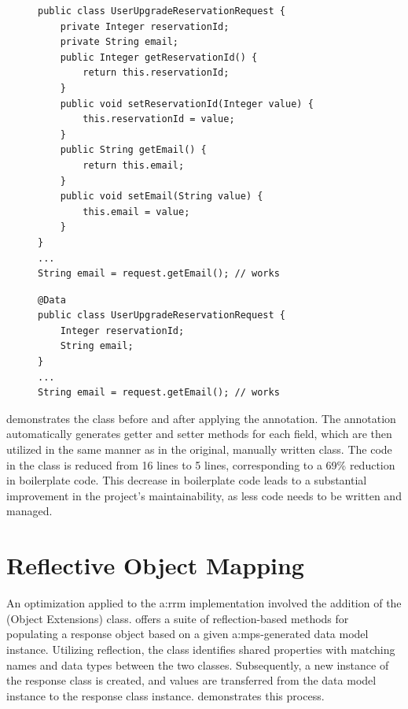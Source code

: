\begin{figure}[H]
\begin{minipage}[t]{0.5\textwidth}
\begin{verbatim}
public class UserUpgradeReservationRequest {
    private Integer reservationId;
    private String email;
    public Integer getReservationId() {
        return this.reservationId;
    }
    public void setReservationId(Integer value) {
        this.reservationId = value;
    }
    public String getEmail() {
        return this.email;
    }
    public void setEmail(String value) {
        this.email = value;
    }
}
...
String email = request.getEmail(); // works
\end{verbatim}
\end{minipage}
\hfill
\begin{minipage}[t]{0.5\textwidth}
\begin{verbatim}
@Data
public class UserUpgradeReservationRequest {
    Integer reservationId;
    String email;
}
...
String email = request.getEmail(); // works
\end{verbatim}
\end{minipage}
\label{lst:lombok-example}
\end{figure}

 demonstrates the  class before and after applying the  annotation. The  annotation automatically generates getter and setter methods for each field, which are then utilized in the same manner as in the original, manually written class. The code in the  class is reduced from 16 lines to 5 lines, corresponding to a 69\% reduction in boilerplate code. This decrease in boilerplate code leads to a substantial improvement in the project's maintainability, as less code needs to be written and managed.

\section{Reflective Object Mapping}\label{sec:impl-reflective-object-mapping}

An optimization applied to the \gls{a:rrm} implementation involved the addition of the  (Object Extensions) class.  offers a suite of reflection-based methods for populating a response object based on a given \gls{a:mps}-generated data model instance. Utilizing reflection, the  class identifies shared properties with matching names and data types between the two classes. Subsequently, a new instance of the response class is created, and values are transferred from the data model instance to the response class instance.  demonstrates this process.

